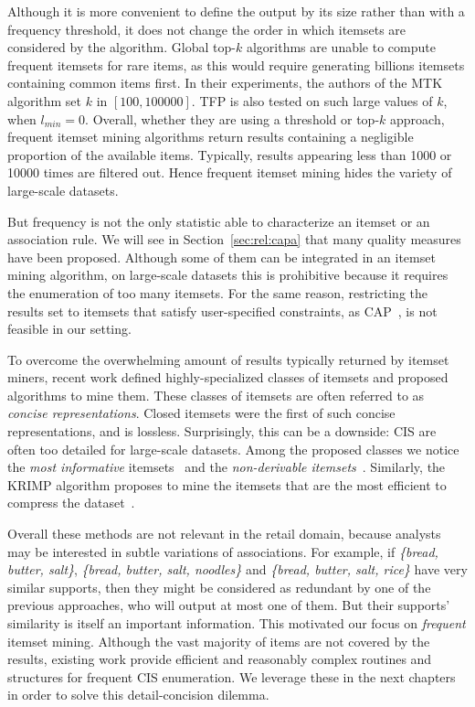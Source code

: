 Although it is more convenient to define the output by its size rather than with a frequency threshold,
it does not change the order in which itemsets are considered by the algorithm.
Global top-$k$ algorithms are unable to compute frequent itemsets for rare items,
as this would require generating billions itemsets containing common items first.
In their experiments, the authors of the MTK algorithm set $k$ in $[100, 100000]$.
TFP is also tested on such large values of $k$, when $l_{min}=0$.
Overall, whether they are using a threshold or top-$k$ approach,
frequent itemset mining algorithms return
results containing a negligible proportion of the available items.
Typically, results appearing less than \num{1000} or \num{10000} times are filtered out.
Hence frequent itemset mining hides the variety of large-scale datasets.

But frequency is not the only statistic able to characterize an itemset or an association rule.
We will see in Section~\ref{sec:rel:capa} that many quality measures have been proposed.
Although some of them can be integrated in an itemset mining algorithm,
on large-scale datasets this is prohibitive because it requires the enumeration of too many itemsets.
For the same reason, restricting the results set to itemsets that satisfy user-specified constraints,
as CAP~\cite{NgSIGMOD98}, is not feasible in our setting.


To overcome the overwhelming amount of results typically returned by itemset miners,
recent work defined highly-specialized classes of itemsets and proposed algorithms to mine them.
These classes of itemsets are often referred to as {\em concise representations}.
Closed itemsets were the first of such concise representations, and is lossless.
Surprisingly, this can be a downside: CIS are often too detailed for large-scale datasets.
Among the proposed classes we notice the {\em most informative} itemsets~\cite{Mampaey2011KDD,Mampaey2012TKDD} and the
{\em non-derivable itemsets}~\cite{calders2007non}.
Similarly, the KRIMP algorithm proposes to mine the itemsets that are the most efficient to compress the dataset~\cite{vreeken2011krimp}.

Overall these methods are not relevant in the retail domain,
because analysts may be interested in subtle variations of associations.
For example,
if {\em \{bread, butter, salt\}}, {\em \{bread, butter, salt, noodles\}} and {\em \{bread, butter, salt, rice\}}
have very similar supports,
then they might be considered as redundant by one of the previous approaches,
who will output at most one of them.
But their supports' similarity is itself an important information.
This motivated our focus on {\em frequent} itemset mining.
Although the vast majority of items are not covered by the results,
existing work provide efficient and reasonably complex routines and structures for frequent CIS enumeration.
We leverage these in the next chapters
in order to solve this detail-concision dilemma.





